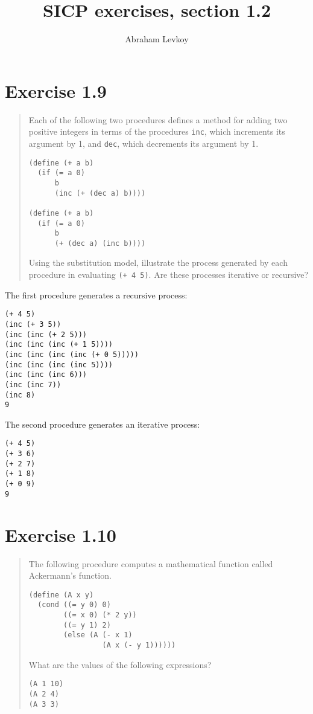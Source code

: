 \documentclass{article}
\author{Abraham Levkoy}
\title{SICP exercises, section 1.2}
\begin{document}
\maketitle

\section{Exercise 1.9}
\begin{quote}
    Each of the following two procedures defines a method for adding two
    positive integers in terms of the procedures \verb|inc|, which increments
    its argument by 1, and \verb|dec|, which decrements its argument by 1.
    \begin{lstlisting}
(define (+ a b)
  (if (= a 0)
      b
      (inc (+ (dec a) b))))

(define (+ a b)
  (if (= a 0)
      b
      (+ (dec a) (inc b))))
    \end{lstlisting}
    Using the substitution model, illustrate the process generated by each
    procedure in evaluating \verb|(+ 4 5)|. Are these processes iterative or
    recursive?
\end{quote}

The first procedure generates a recursive process:

\begin{minipage}{\linewidth}
\begin{verbatim}
(+ 4 5)
(inc (+ 3 5))
(inc (inc (+ 2 5)))
(inc (inc (inc (+ 1 5))))
(inc (inc (inc (inc (+ 0 5)))))
(inc (inc (inc (inc 5))))
(inc (inc (inc 6)))
(inc (inc 7))
(inc 8)
9
\end{verbatim}
\end{minipage}
\vspace{\baselineskip}

The second procedure generates an iterative process:

\begin{minipage}{\linewidth}
\begin{verbatim}
(+ 4 5)
(+ 3 6)
(+ 2 7)
(+ 1 8)
(+ 0 9)
9
\end{verbatim}
\end{minipage}

\section{Exercise 1.10}
\begin{quote}
	The following procedure computes a mathematical function called Ackermann’s
	function.
    \begin{lstlisting}
(define (A x y)
  (cond ((= y 0) 0)
        ((= x 0) (* 2 y))
        ((= y 1) 2)
        (else (A (- x 1)
                 (A x (- y 1))))))
    \end{lstlisting}
    What are the values of the following expressions?

    \verb|(A 1 10)|\\
    \verb|(A 2 4)|\\
    \verb|(A 3 3)|\\
\end{quote}
\end{document}
